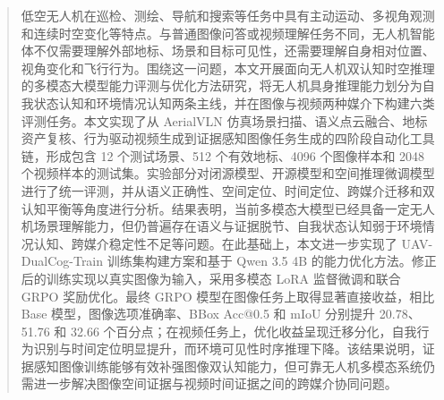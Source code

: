 
\begin{abstract}
    低空无人机在巡检、测绘、导航和搜索等任务中具有主动运动、多视角观测和连续时空变化等特点。与普通图像问答或视频理解任务不同，无人机智能体不仅需要理解外部地标、场景和目标可见性，还需要理解自身相对位置、视角变化和飞行行为。围绕这一问题，本文开展面向无人机双认知时空推理的多模态大模型能力评测与优化方法研究，将无人机具身推理能力划分为自我状态认知和环境情况认知两条主线，并在图像与视频两种媒介下构建六类评测任务。本文实现了从 AerialVLN 仿真场景扫描、语义点云融合、地标资产复核、行为驱动视频生成到证据感知图像任务生成的四阶段自动化工具链，形成包含 12 个测试场景、512 个有效地标、4096 个图像样本和 2048 个视频样本的测试集。实验部分对闭源模型、开源模型和空间推理微调模型进行了统一评测，并从语义正确性、空间定位、时间定位、跨媒介迁移和双认知平衡等角度进行分析。结果表明，当前多模态大模型已经具备一定无人机场景理解能力，但仍普遍存在语义与证据脱节、自我状态认知弱于环境情况认知、跨媒介稳定性不足等问题。在此基础上，本文进一步实现了 UAV-DualCog-Train 训练集构建方案和基于 Qwen 3.5 4B 的能力优化方法。修正后的训练实现以真实图像为输入，采用多模态 LoRA 监督微调和联合 GRPO 奖励优化。最终 GRPO 模型在图像任务上取得显著直接收益，相比 Base 模型，图像选项准确率、BBox Acc@0.5 和 mIoU 分别提升 20.78、51.76 和 32.66 个百分点；在视频任务上，优化收益呈现迁移分化，自我行为识别与时间定位明显提升，而环境可见性时序推理下降。该结果说明，证据感知图像训练能够有效补强图像双认知能力，但可靠无人机多模态系统仍需进一步解决图像空间证据与视频时间证据之间的跨媒介协同问题。
\end{abstract}

